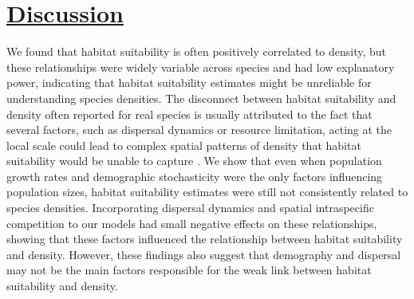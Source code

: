 
\section*{\textbf{\underline{Discussion}}}
We found that habitat suitability is often positively correlated to density, but these relationships were widely variable across species and had low explanatory power, indicating that habitat suitability estimates might be unreliable for understanding species densities. The disconnect between habitat suitability and density often reported for real species is usually attributed to the fact that several factors, such as dispersal dynamics or resource limitation, acting at the local scale could lead to complex spatial patterns of density that habitat suitability would be unable to capture \parencite{weber2017,dallas2018,jimenez2021}. We show that even when population growth rates and demographic stochasticity were the only factors influencing population sizes, habitat suitability estimates were still not consistently related to species densities. Incorporating dispersal dynamics and spatial intraspecific competition to our models had small negative effects on these relationships, showing that these factors influenced the relationship between habitat suitability and density. However, these findings also suggest that demography and dispersal may not be the main factors responsible for the weak link between habitat suitability and density. 

